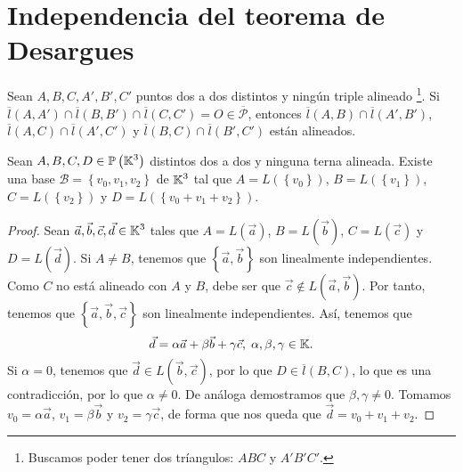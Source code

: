 \section{Independencia del teorema de Desargues}
\begin{theorem}
Sean $\displaystyle A,B,C,A', B', C' $ puntos dos a dos distintos y ningún triple alineado \footnote{Buscamos poder tener dos tríangulos: $\displaystyle ABC $ y $\displaystyle A'B'C' $.}. Si $\displaystyle \overline{l}\left(A,A'\right) \cap \overline{l}\left(B,B'\right)\cap \overline{l}\left(C,C'\right) = O \in \overline{\mathcal{P}} $, entonces $\displaystyle \overline{l}\left(A,B\right) \cap \overline{l}\left(A',B'\right) $, $\displaystyle \overline{l}\left(A,C\right) \cap \overline{l}\left(A',C'\right) $ y $\displaystyle \overline{l}\left(B,C\right) \cap \overline{l}\left(B',C'\right) $ están alineados.
\end{theorem}
\begin{lema}
	Sean $\displaystyle A,B,C,D \in \mathbb{P}\left(\mathbb{K}^{3}\right) $ distintos dos a dos y ninguna terna alineada. Existe una base $\displaystyle \mathcal{B} = \left\{ v_{0}, v_{1}, v_{2}\right\}  $ de $\displaystyle \mathbb{K}^{3} $ tal que $\displaystyle A = L\left( \left\{ v_{0}\right\} \right) $, $\displaystyle B = L\left( \left\{ v_{1}\right\} \right) $, $\displaystyle C = L\left( \left\{ v_{2}\right\} \right) $ y $\displaystyle D = L\left( \left\{ v_{0}+v_{1}+v_{2}\right\} \right) $.
\end{lema}
\begin{proof}
	Sean $\displaystyle \vec{a}, \vec{b}, \vec{c}, \vec{d} \in \mathbb{K}^{3} $ tales que $\displaystyle A = L\left(\vec{a}\right) $, $ B = L\left(\vec{b}\right) $, $\displaystyle C = L\left(\vec{c}\right) $ y $D = L\left(\vec{d}\right) $. Si $\displaystyle A \neq B $, tenemos que $\displaystyle \left\{ \vec{a}, \vec{b}\right\}  $ son linealmente independientes. 
	Como $\displaystyle C $ no está alineado con $\displaystyle A $ y $\displaystyle B $, debe ser que $\displaystyle \vec{c} \not\in L\left(\vec{a}, \vec{b}\right) $. Por tanto, tenemos que $\displaystyle \left\{ \vec{a}, \vec{b}, \vec{c}\right\}  $ son linealmente independientes. Así, tenemos que 
	\[\vec{d} = \alpha \vec{a} + \beta \vec{b} + \gamma \vec{c}, \; \alpha, \beta, \gamma \in \mathbb{K} .\]
Si $\displaystyle \alpha = 0 $, tenemos que $\displaystyle \vec{d} \in L\left(\vec{b}, \vec{c}\right) $, por lo que $\displaystyle D \in \overline{l}\left(B,C\right) $, lo que es una contradicción, por lo que $\displaystyle \alpha \neq 0 $. De análoga demostramos que $\displaystyle \beta, \gamma \neq 0 $. Tomamos $\displaystyle v_{0} = \alpha \vec{a} $, $\displaystyle v_{1} = \beta \vec{b} $ y $\displaystyle v_{2} = \gamma \vec{c} $, de forma que nos queda que $\displaystyle \vec{d} = v_{0} + v_{1}+v_{2} $.
\end{proof}

